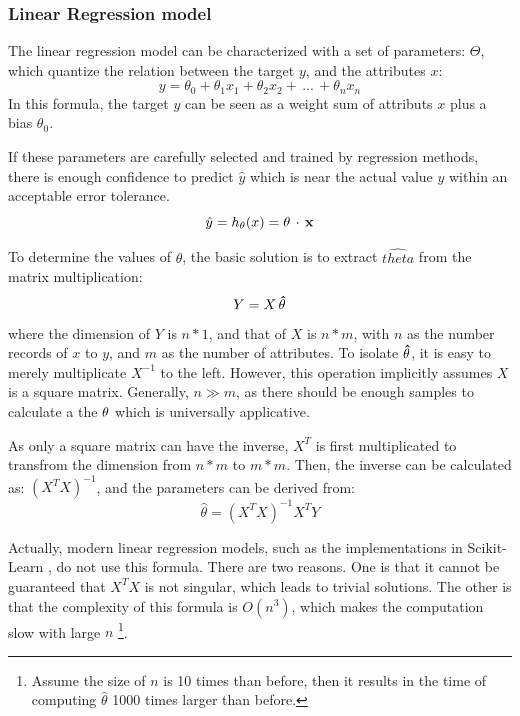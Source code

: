 \documentclass[12pt,a4paper]{report}
\begin{document}
        \subsubsection{Linear Regression model}
        The linear regression model can be characterized with a set of parameters: $\Theta$, which quantize the relation between the target $y$, and the attributes $x$:
        \begin{equation}
            y = \theta_0 + \theta_1 x_1 + \theta_2 x_2 + \,...\,+\theta_nx_n
        \end{equation}
        In this formula, the target $y$ can be seen as a weight sum of attributs $x$ plus a bias $\theta_0$. 
        
        If these parameters are carefully selected and trained by regression methods, there is enough confidence to predict $\hat{y}$ which is near the actual value $y$ within an acceptable error tolerance.
        \begin{equation}
            \hat{y} = h_\theta(x) = \bf{\theta}\, \cdot \,x
        \end{equation}

        To determine the values of $\theta$, the basic solution is to extract $\hat{theta}$ from the matrix multiplication:
        \begin{equation}
            Y = X\, \bf{\hat{\theta}}
        \end{equation}
        where the dimension of $Y$ is $ n*1$, and that of $X$ is $n*m$, with $n$ as the number records of $x$ to $y$, and $m$ as the number of attributes.
        To isolate $\bf{\hat{\theta}}$, it is easy to merely multiplicate $X^{-1}$ to the left. However, this operation implicitly assumes $X$ is a square matrix. Generally, $n \gg m$, as there should be enough samples to calculate a the $\bf{\theta}$ which is universally applicative.

        As only a square matrix can have the inverse, $X^T$ is first multiplicated to transfrom the dimension from $n*m$ to $m*m$. Then, the inverse can be calculated as: $(X^TX)^{-1}$, and the parameters can be derived from:
        \begin{equation}
            \hat{\theta} = (X^TX)^{-1}X^TY
        \end{equation}

        Actually, modern linear regression models, such as the implementations in Scikit-Learn \cite{website:scikit}, do not use this formula. There are two reasons. One is that it cannot be guaranteed that $X^TX$ is not singular, which leads to trivial solutions. The other is that the complexity of this formula is $O(n^3)$, which makes the computation slow with large $n$ \footnote{Assume the size of $n$ is 10 times than before, then it results in the time of computing $\hat{\theta}$ 1000 times larger than before.}.
\end{document}
